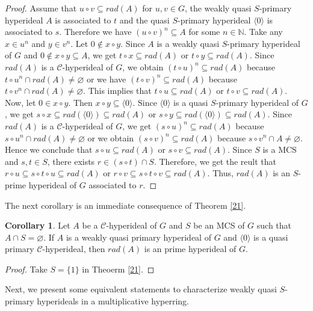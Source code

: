 \documentclass[preprint,review,10pt]{amsart}
\theoremstyle{definition}
\newtheorem{corollary}[theorem]{Corollary}
\theoremstyle{remark}
\numberwithin{equation}{section}
\begin{document}
\begin{proof}
Assume that $u \circ v \subseteq rad(A)$ for $u,v \in G$, the weakly quasi $S$-primary hyperideal  $A$ is associated to $t$ and the quasi $S$-primary hyperideal $\langle 0 \rangle$ is associated to $s$. Therefore we have $(u \circ v )^n \subseteq A$ for some $n \in \mathbb{N}$. Take any $x \in u^n$ and $y \in v^n$. Let  $0 \notin x \circ y$. Since $A$ is a weakly quasi $S$-primary hyperideal of $G$ and $0 \notin x \circ y \subseteq A$,  we get  $t \circ x \subseteq rad(A)$ or $t \circ y \subseteq rad(A)$. Since $rad(A)$ is a  $\mathcal{C}$-hyperideal of $G$, we obtain $ (t \circ u) ^n \subseteq rad(A)$ because $ t \circ u^n  \cap rad(A) \neq \varnothing$ or we have $ (t \circ v )^n \subseteq rad(A)$ because $ t \circ v^n  \cap rad(A) \neq \varnothing$. This implies that $t \circ u \subseteq rad(A)$ or $t \circ v \subseteq rad(A)$. Now, let $0 \in x \circ y$. Then $x \circ y \subseteq \langle 0 \rangle$. Since $\langle 0 \rangle$ is a quasi $S$-primary hyperideal of $G$, we get $s \circ x \subseteq  rad(\langle 0 \rangle)  \subseteq rad(A)$ or $s \circ y \subseteq rad(\langle 0 \rangle) \subseteq rad(A)$. Since $rad(A)$ is a  $\mathcal{C}$-hyperideal of $G$, we get $ (s \circ u) ^n \subseteq rad(A)$ because $ s \circ u^n  \cap rad(A) \neq \varnothing$ or we obtain $ (s \circ v )^n \subseteq rad(A)$ because $ s \circ v^n  \cap A \neq \varnothing$. Hence we conclude that $s \circ u \subseteq rad(A)$ or $s \circ v \subseteq rad(A)$. Since $S$ is a MCS and $s,t \in S$, there exists $r \in (s \circ t) \cap S$. Therefore, we get the reult that $r \circ u \subseteq s \circ t \circ u \subseteq rad(A)$ or $r \circ v \subseteq s \circ t \circ v \subseteq rad(A)$. Thus, $rad(A)$ is an $S$-prime hyperideal of $G$  associated to $r$.
\end{proof}
The next corollary is an immediate consequence of Theorem \ref{21}.
\begin{corollary} \label{22}
Let $A$ be a  $\mathcal{C}$-hyperideal of $G$ and $S$ be an MCS of $G$ such that $A \cap S=\varnothing$. If $A$ is a weakly quasi  primary hyperideal of $G$ and $\langle 0 \rangle$ is a quasi  primary $\mathcal{C}$-hyperideal, then $rad(A)$ is an prime hyperideal of $G$. 
\end{corollary}
\begin{proof}
Take $S = \{1\}$ in Theoerm \ref{21}.
\end{proof}
Next, we present some equivalent statements to characterize weakly quasi  $S$-primary hyperideals in a multiplicative hyperring.
\end{document}
